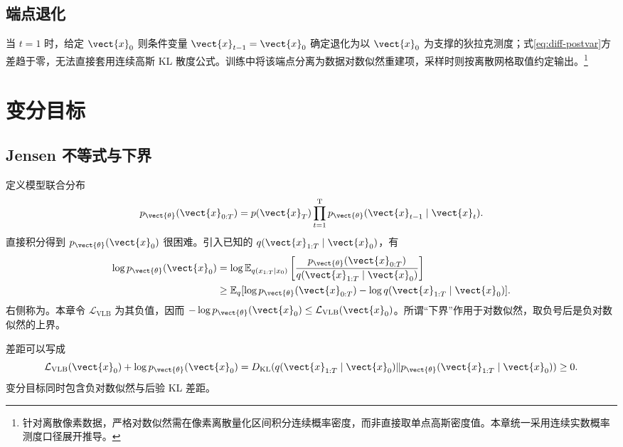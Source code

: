 \documentclass[../textbook.tex]{subfiles}
\begin{document}
\subsection{端点退化}
当 $t=1$ 时，给定 $\vect{x}_0$ 则条件变量 $\vect{x}_{t-1}=\vect{x}_0$ 确定退化为以 $\vect{x}_0$ 为支撑的狄拉克测度；式\eqref{eq:diff-postvar}方差趋于零，无法直接套用连续高斯 KL 散度公式。训练中将该端点分离为数据对数似然重建项，采样时则按离散网格取值约定输出。\footnote{针对离散像素数据，严格对数似然需在像素离散量化区间积分连续概率密度，而非直接取单点高斯密度值。本章统一采用连续实数概率测度口径展开推导。}

\section{变分目标}

\subsection{Jensen 不等式与下界}
定义模型联合分布
\begin{equation}
 p_{\vect{\theta}}(\vect{x}_{0:T})=p(\vect{x}_T)\prod_{t=1}^{\mathrm{T}}p_{\vect{\theta}}(\vect{x}_{t-1}\mid \vect{x}_t).
\end{equation}
直接积分得到 $p_{\vect{\theta}}(\vect{x}_0)$ 很困难。引入已知的 $q(\vect{x}_{1:T}\mid \vect{x}_0)$，有
\begin{align}
 \log p_{\vect{\theta}}(\vect{x}_0)&=\log\mathbb E_{q(x_{1:T}\mid x_0)}
 \left[\frac{p_{\vect{\theta}}(\vect{x}_{0:T})}{q(\vect{x}_{1:T}\mid \vect{x}_0)}\right]\\
 &\ge\mathbb E_q[\log p_{\vect{\theta}}(\vect{x}_{0:T})-\log q(\vect{x}_{1:T}\mid \vect{x}_0)].
\end{align}
右侧称为。本章令 $\mathcal L_{\mathrm{VLB}}$ 为其负值，因而 $-\log p_{\vect{\theta}}(\vect{x}_0)\le\mathcal L_{\mathrm{VLB}}(\vect{x}_0)$。所谓“下界”作用于对数似然，取负号后是负对数似然的上界。

差距可以写成
\begin{equation}
 \mathcal L_{\mathrm{VLB}}(\vect{x}_0)+\log p_{\vect{\theta}}(\vect{x}_0)
 =D_{\mathrm{KL}}(q(\vect{x}_{1:T}\mid \vect{x}_0)\|p_{\vect{\theta}}(\vect{x}_{1:T}\mid \vect{x}_0))\ge0.
\end{equation}
变分目标同时包含负对数似然与后验 KL 差距。
\end{document}
